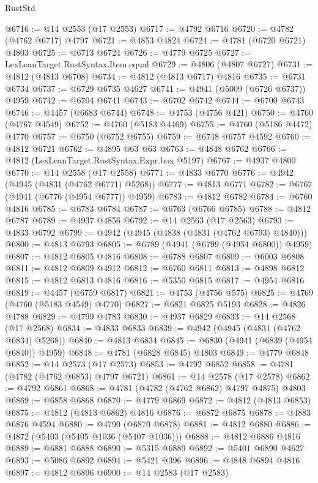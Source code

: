 \begin{lexlean}{RustStd}
\begin{coremodule}
@6716 := @14 @2553 (@17 @2553)
@6717 := @4792 @6716
@6720 := @4782 (@4762 @6717) @4797
@6721 := @4853 @4824
@6724 := @4781 (@6720 @6721) @4803
@6725 := @6713 @6724
@6726 := @4779 @6725
@6727 := LexLeanTarget.RustSyntax.Item.equal
@6729 := @4806 (@4807 @6727)
@6731 := @4812 (@4813 @6708)
@6734 := @4812 (@4813 @6717) @4816
@6735 := @6731 @6734
@6737 := @6729 @6735 @4627
@6741 := @4941 (@5009 (@6726 @6737)) @4959
@6742 := @6704 @6741
@6743 := @6702 @6742
@6744 := @6700 @6743
@6746 := @4457 (@6683 @6744)
@6748 := @4753 (@4756 @421)
@6750 := @4760 (@4767 @4549)
@6752 := @4760 (@5183 @4469)
@6755 := @4760 (@5186 @4472) @4770
@6757 := @6750 (@6752 @6755)
@6759 := @6748 @6757 @4592
@6760 := @4812 @6721
@6762 := @4895 @63 @63
@6763 := @4848 @6762
@6766 := @4812 (LexLeanTarget.RustSyntax.Expr.box @5197)
@6767 := @4937 @4800
@6770 := @14 @2558 (@17 @2558)
@6771 := @4833 @6770
@6776 := @4942 (@4945 (@4831 (@4762 @6771) @5268))
@6777 := @4813 @6771
@6782 := @6767 (@4941 (@6776 (@4954 @6777)) @4959)
@6783 := @4812 @6782
@6784 := @6760 @4816
@6785 := @6783 @6784
@6787 := @6763 (@6766 @6785)
@6788 := @4812 @6787
@6789 := @4937 @4856
@6792 := @14 @2563 (@17 @2563)
@6793 := @4833 @6792
@6799 := @4942 (@4945 (@4838 (@4831 (@4762 @6793) @4840)))
@6800 := @4813 @6793
@6805 := @6789 (@4941 (@6799 (@4954 @6800)) @4959)
@6807 := @4812 @6805 @4816
@6808 := @6788 @6807
@6809 := @6003 @6808
@6811 := @4812 @6809 @4912
@6812 := @6760 @6811
@6813 := @4898 @6812
@6815 := @4812 @6813 @4816
@6816 := @5350 @6815
@6817 := @4954 @6816
@6819 := @4457 (@6759 @6817)
@6821 := @4753 (@4756 @575)
@6825 := @4769 (@4760 (@5183 @4549) @4770)
@6827 := @6821 @6825 @5193
@6828 := @4826 @4788
@6829 := @4799 @4783
@6830 := @4937 @6829
@6833 := @14 @2568 (@17 @2568)
@6834 := @4833 @6833
@6839 := @4942 (@4945 (@4831 (@4762 @6834) @5268))
@6840 := @4813 @6834
@6845 := @6830 (@4941 (@6839 (@4954 @6840)) @4959)
@6848 := @4781 (@6828 @6845) @4803
@6849 := @4779 @6848
@6852 := @14 @2573 (@17 @2573)
@6853 := @4792 @6852
@6858 := @4781 (@4782 (@4762 @6853) @4797 @6721)
@6861 := @14 @2578 (@17 @2578)
@6862 := @4792 @6861
@6868 := @4781 (@4782 (@4762 @6862) @4797 @4875) @4803
@6869 := @6858 @6868
@6870 := @4779 @6869
@6872 := @4812 (@4813 @6853)
@6875 := @4812 (@4813 @6862) @4816
@6876 := @6872 @6875
@6878 := @4883 @6876 @4594
@6880 := @4790 (@6870 @6878)
@6881 := @4812 @6880
@6886 := @4872 (@5403 (@5405 @1036 (@5407 @1036)))
@6888 := @4812 @6886 @4816
@6889 := @6881 @6888
@6890 := @5315 @6889
@6892 := @5401 @6890 @4627
@6893 := @5086 @6892
@6894 := @5421 @396
@6896 := @4848 @6894 @4816
@6897 := @4812 @6896
@6900 := @14 @2583 (@17 @2583)

\end{coremodule}
\end{lexlean}
